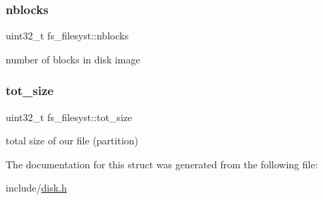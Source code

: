 \subsubsection{\texorpdfstring{nblocks}{nblocks}}
{\footnotesize\ttfamily uint32\+\_\+t fs\+\_\+filesyst\+::nblocks}

number of blocks in disk image \mbox{\label{structfs__filesyst_a5c41788f61d03bed3e6d33879e7b0e88}} 
\subsubsection{\texorpdfstring{tot\_size}{tot\_size}}
{\footnotesize\ttfamily uint32\+\_\+t fs\+\_\+filesyst\+::tot\+\_\+size}

total size of our file (partition) 

The documentation for this struct was generated from the following file\+:\begin{DoxyCompactItemize}
\item 
include/\mbox{\hyperlink{disk_8h}{disk.\+h}}\end{DoxyCompactItemize}
